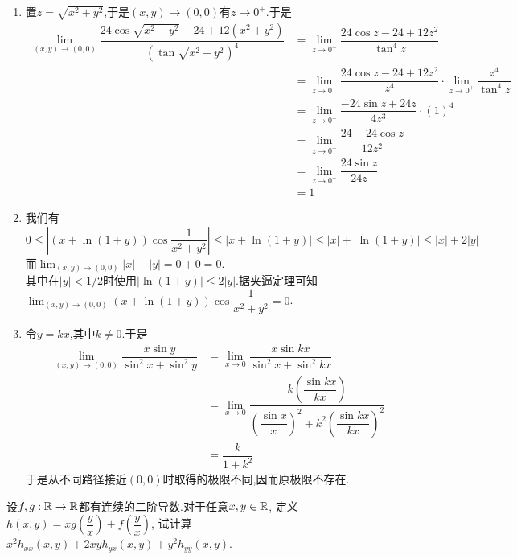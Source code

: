 \documentclass{ctexart}
\begin{document}
\begin{solution}
\begin{enumerate}[label=\textbf{(\arabic*)},leftmargin=*]
        \item 置$z=\sqrt{x^2+y^2}$,于是$(x,y)\to(0,0)$有$z\to 0^+$.于是
            $$\begin{aligned}
                \lim_{(x,y)\to(0,0)}\dfrac{24\cos\sqrt{x^2+y^2}-24+12\left(x^2+y^2\right)}{\left(\tan\sqrt{x^2+y^2}\right)^4}
                &= \lim_{z\to 0^+}\dfrac{24\cos z-24+12z^2}{\tan^4 z} \\
                &= \lim_{z\to 0^+}\dfrac{24\cos z-24+12z^2}{z^4}\cdot\lim_{z\to 0^+}\dfrac{z^4}{\tan^4 z} \\
                &= \lim_{z\to 0^+}\dfrac{-24\sin z+24z}{4z^3}\cdot(1)^4\\
                &= \lim_{z\to 0^+}\dfrac{24-24\cos z}{12z^2} \\
                &= \lim_{z\to 0^+}\dfrac{24\sin z}{24z}\\
                &= 1
            \end{aligned}$$
        \item 我们有$$0\leqslant\left|\left(x+\ln(1+y)\right)\cos\dfrac{1}{x^2+y^2}\right|\leqslant\left|x+\ln(1+y)\right|\leqslant\left|x\right|+\left|\ln(1+y)\right|\leqslant\left|x\right|+2\left|y\right|$$
            而$\displaystyle\lim_{(x,y)\to(0,0)}|x|+|y|=0+0=0$.\\
            其中在$|y|<1/2$时使用$|\ln(1+y)|\leqslant2|y|$.据夹逼定理可知$\displaystyle\lim_{(x,y)\to(0,0)}\left(x+\ln(1+y)\right)\cos\dfrac{1}{x^2+y^2}=0$.
        \item 令$y=kx$,其中$k\neq 0$.于是
            $$\begin{aligned}
                \lim_{(x,y)\to(0,0)}\dfrac{x\sin y}{\sin^2x+\sin^2y}
                &= \lim_{x\to0}\dfrac{x\sin kx}{\sin^2x+\sin^2kx} \\
                &= \lim_{x\to0}\dfrac{k\left(\dfrac{\sin kx}{kx}\right)}{\left(\dfrac{\sin x}{x}\right)^2+k^2\left(\dfrac{\sin kx}{kx}\right)^2} \\
                &= \dfrac{k}{1+k^2}
            \end{aligned}$$
            于是从不同路径接近$(0,0)$时取得的极限不同,因而原极限不存在.
    \end{enumerate}
\end{solution}
\begin{problem}[3.(10\songti{分})]
设$f,g:\mathbb{R}\to\mathbb{R}$都有连续的二阶导数.对于任意$x,y\in\mathbb{R}$,
        定义$h(x,y)=xg\left(\dfrac{y}{x}\right)+f\left(\dfrac{y}{x}\right)$,
        试计算$x^2h_{xx}(x,y)+2xyh_{yx}(x,y)+y^2h_{yy}(x,y)$.
\end{problem}
\end{document}
